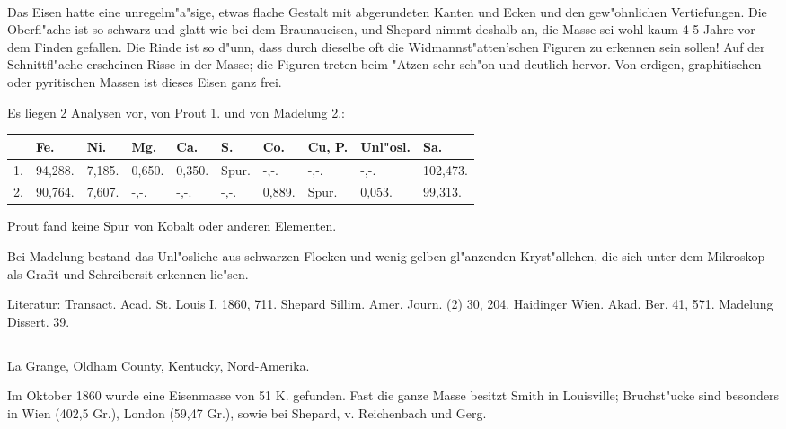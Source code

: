 \documentclass[a4paper, 11pt, oneside]{article}
\begin{document}
\paragraph{}
Das Eisen hatte eine unregelm"a"sige, etwas flache Gestalt mit abgerundeten Kanten und Ecken und den gew"ohnlichen Vertiefungen. Die Oberfl"ache ist so schwarz und glatt wie bei dem Braunaueisen, und Shepard nimmt deshalb an, die Masse sei wohl kaum 4-5 Jahre vor dem Finden gefallen. Die Rinde ist so d"unn, dass durch dieselbe oft die Widmannst"atten'schen Figuren zu erkennen sein sollen! Auf der Schnittfl"ache erscheinen Risse in der Masse; die Figuren treten beim "Atzen sehr sch"on und deutlich hervor. Von erdigen, graphitischen oder pyritischen Massen ist dieses Eisen ganz frei.

Es liegen 2 Analysen vor, von Prout 1. und von Madelung 2.:
\begin{table}[H]
    \centering\swabfamily\Large
    \normalsize
    \begin{tabular}{l l l l l l l l l l}
         & Fe. & Ni. & Mg. & Ca. & S. & Co. & Cu, P. & Unl"osl. & Sa. \\ \hline
        1. & 94,288. & 7,185. & 0,650. & 0,350. & Spur. & -,-. & -,-. & -,-. & 102,473. \\
        2. & 90,764. & 7,607. & -,-. & -,-. & -,-. & 0,889. & Spur. & 0,053. & 99,313. \\
    \end{tabular}
\end{table}

Prout fand keine Spur von Kobalt oder anderen Elementen.

Bei Madelung bestand das Unl"osliche aus schwarzen Flocken und wenig gelben gl"anzenden Kryst"allchen, die sich unter dem Mikroskop als Grafit und Schreibersit erkennen lie"sen.

\normalsize
Literatur: Transact. Acad. St. Louis I, 1860, 711. Shepard Sillim. Amer. Journ. (2) 30, 204. Haidinger Wien. Akad. Ber. 41, 571. Madelung Dissert. 39.

\subsection{}
\LARGE
\paragraph{}
La Grange, Oldham County, Kentucky, Nord-Amerika.

Im Oktober 1860 wurde eine Eisenmasse von 51 K. gefunden. Fast die ganze Masse besitzt Smith in Louisville; Bruchst"ucke sind besonders in Wien (402,5 Gr.), London (59,47 Gr.), sowie bei Shepard, v. Reichenbach und Gerg.
\end{document}
